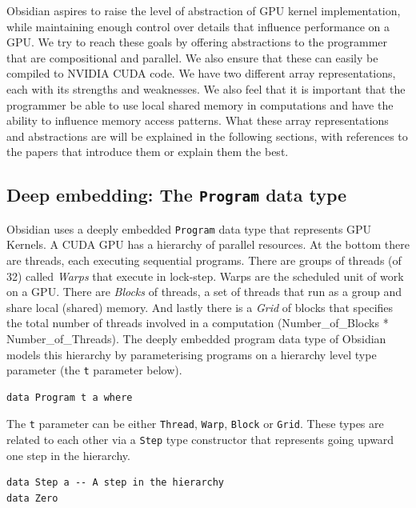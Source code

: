 \documentclass[a4paper]{book}
\begin{document}
Obsidian aspires to raise the level of abstraction of GPU kernel implementation, 
while maintaining enough control over details that influence performance on a GPU. 
We try to reach these goals by offering abstractions to the programmer that are 
compositional and parallel. We also ensure that these can easily be compiled 
to NVIDIA CUDA code. We have two different array representations, each with 
its strengths and weaknesses. We also feel that it is important that the programmer 
be able to use local shared memory in computations and have the ability to influence 
memory access patterns. What these array representations and abstractions are 
will be explained in the following sections, with references to the papers 
that introduce them or explain them the best. 


\subsection{Deep embedding: The {\tt Program} data type}

Obsidian uses a deeply embedded {\tt Program} data type that represents GPU Kernels. 
A CUDA GPU has a hierarchy of parallel resources. At the bottom there are threads, each 
executing sequential programs. There are groups of threads (of 32) called {\em Warps} that 
execute in lock-step. Warps are the scheduled unit of work on a GPU. There are {\em Blocks} 
of threads, a set of threads that run as a group and share local (shared) memory. And 
lastly there is a {\em Grid} of blocks that specifies the total number of threads involved 
in a computation (Number\_of\_Blocks * Number\_of\_Threads). The deeply embedded program 
data type of Obsidian models this hierarchy by parameterising programs on a hierarchy 
level type parameter (the  {\tt t} parameter below).

\begin{verbatim} 
data Program t a where
\end{verbatim}

The {\tt t} parameter can be either {\tt Thread}, {\tt Warp}, {\tt Block} or {\tt Grid}.
These types are related to each other via a {\tt Step} type constructor that represents 
going upward one step in the hierarchy. 

\begin{verbatim} 
data Step a -- A step in the hierarchy
data Zero
\end{verbatim} 
\end{document}
